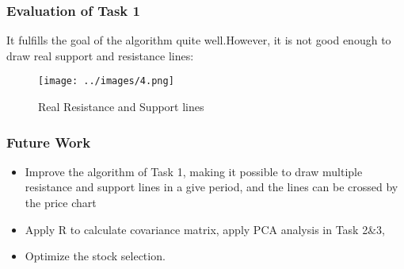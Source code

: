 \documentclass[compress,handout,10pt]{beamer}
\let\olditem\item
\renewcommand{\item}{\setlength{\itemsep}{0.5\baselineskip}\olditem}
\begin{document}
\begin{frame}
    \frametitle{Evaluation of Task 1}
It fulfills the goal of the algorithm quite well.However, it is not good enough to draw real support and resistance lines:
\begin{figure}[h]
    \begin{center}
        \texttt{[image: ../images/4.png]}
    \end{center}
    \caption{Real Resistance and Support lines}
    \label{fig:rs}
\end{figure}  
\end{frame}


\begin{frame}
    \frametitle{Future Work}
\begin {itemize}
\item Improve the algorithm of Task 1, making it possible to draw multiple resistance and support lines in a give period, and the lines can be crossed by the price chart
\item Apply R to calculate covariance matrix, apply PCA analysis in Task 2\&3,
\item Optimize the stock selection.
\end{itemize}
\end{frame}
\end{document}
